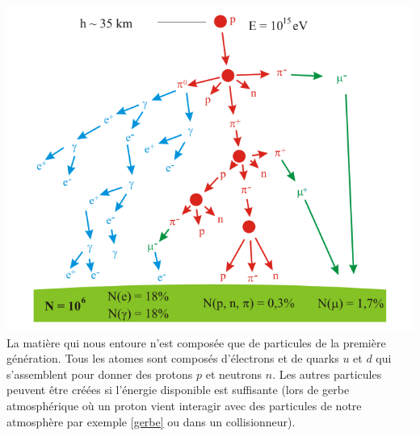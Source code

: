\marginpar
{
\centering
\includegraphics[width=0.95\marginparwidth]{SM/shower.png}
\label{gerbe}
}
La matière qui nous entoure n'est composée que de particules de la première génération. Tous les atomes sont composés d'électrons et de quarks $u$ et $d$ qui s'assemblent pour donner des protons $p$ et neutrons $n$. Les autres particules peuvent être créées si l'énergie disponible est suffisante (lors de gerbe atmosphérique où un proton vient interagir avec des particules de notre atmosphère par exemple \ref{gerbe} ou dans un collisionneur).

